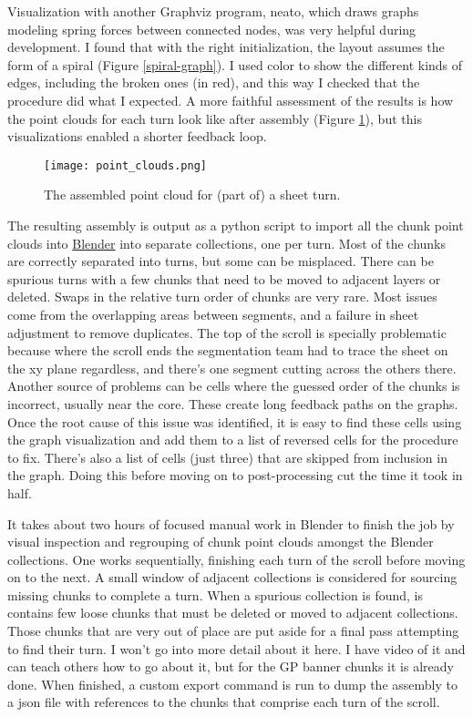 \documentclass{article}
\begin{document}
Visualization with another Graphviz program, neato, which draws graphs modeling spring forces between connected nodes, was very helpful during development. I found that with the right initialization, the layout assumes the form of a spiral (Figure \ref{spiral-graph}). I used color to show the different kinds of edges, including the broken ones (in red), and this way I checked that the procedure did what I expected. A more faithful assessment of the results is how the point clouds for each turn look like after assembly (Figure \ref{Blender-point-clouds}), but this visualizations enabled a shorter feedback loop.

\begin{figure}
    \centering
    \texttt{[image: point\_clouds.png]}
    \caption{The assembled point cloud for (part of) a sheet turn.}
    \label{Blender-point-clouds}
\end{figure}

The resulting assembly is output as a python script to import all the chunk point clouds into \href{https://blender.org}{Blender} into separate collections, one per turn. Most of the chunks are correctly separated into turns, but some can be misplaced. There can be spurious turns with a few chunks that need to be moved to adjacent layers or deleted. Swaps in the relative turn order of chunks are very rare. Most issues come from the overlapping areas between segments, and a failure in sheet adjustment to remove duplicates. The top of the scroll is specially problematic because where the scroll ends the segmentation team had to trace the sheet on the xy plane regardless, and there's one segment cutting across the others there. Another source of problems can be cells where the guessed order of the chunks is incorrect, usually near the core. These create long feedback paths on the graphs. Once the root cause of this issue was identified, it is easy to find these cells using the graph visualization and add them to a list of reversed cells for the procedure to fix. There's also a list of cells (just three) that are skipped from inclusion in the graph. Doing this before moving on to post-processing cut the time it took in half.

It takes about two hours of focused manual work in Blender to finish the job by visual inspection and regrouping of chunk point clouds amongst the Blender collections. One works sequentially, finishing each turn of the scroll before moving on to the next. A small window of adjacent collections is considered for sourcing missing chunks to complete a turn. When a spurious collection is found, is contains few loose chunks that must be deleted or moved to adjacent collections. Those chunks that are very out of place are put aside for a final pass attempting to find their turn. I won't go into more detail about it here. I have video of it and can teach others how to go about it, but for the GP banner chunks it is already done. When finished, a custom export command is run to dump the assembly to a json file with references to the chunks that comprise each turn of the scroll.
\end{document}
